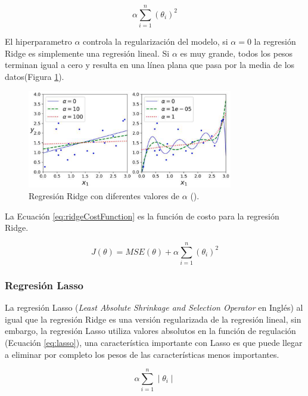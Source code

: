 \begin{equation}
    \label{eq:ridge}
    \alpha \displaystyle\sum\limits_{i=1}^n (\theta_i)^{2}
\end{equation}

El hiperparametro $\alpha$ controla la regularización del modelo, si $\alpha = 0$ la regresión Ridge es simplemente una regresión lineal. Si $\alpha$ es muy grande, todos los pesos terminan igual a cero y resulta en una línea plana que pasa por la media de los datos(Figura \ref{fig:regresionRidge}).

\begin{figure}[H]
    \centering
    \includegraphics[width=0.8\textwidth]{MarcoTeorico/imgs/Ridge.png}
    \caption{Regresión Ridge con diferentes valores de $\alpha$ (\cite{aurelien2019Hands}).}
    \label{fig:regresionRidge}
\end{figure}

La Ecuación \ref{eq:ridgeCostFunction} es la función de costo para la regresión Ridge.

\begin{equation}
    \label{eq:ridgeCostFunction}
    J(\theta) = MSE(\theta)
    + \alpha \displaystyle\sum\limits_{i=1}^n (\theta_i)^{2}
\end{equation}

\subsubsection{Regresión Lasso}

La regresión Lasso (\textit{Least Absolute Shrinkage and Selection Operator} en Inglés) al igual que la regresión Ridge es una versión regularizada de la regresión lineal, sin embargo, la regresión Lasso utiliza valores absolutos en la función de regulación (Ecuación \ref{eq:lasso}), una característica importante con Lasso es que puede llegar a eliminar por completo los pesos de las características menos importantes.

\begin{equation}
    \label{eq:lasso}
    \alpha \displaystyle\sum\limits_{i=1}^n  \mid \theta_i \mid
\end{equation}

